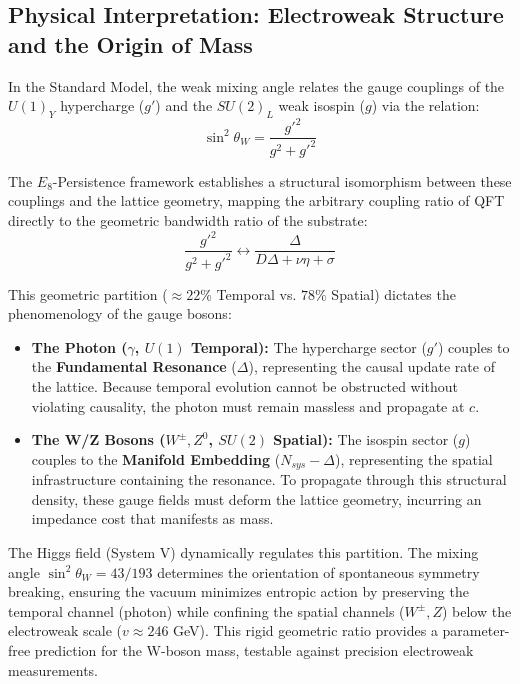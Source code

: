 \subsection{Physical Interpretation: Electroweak Structure and the Origin of Mass}

In the Standard Model, the weak mixing angle relates the gauge couplings of the $U(1)_Y$ hypercharge ($g'$) and the $SU(2)_L$ weak isospin ($g$) via the relation:
\begin{equation}
\sin^2\theta_W = \frac{g'^2}{g^2 + g'^2}
\end{equation}

The $E_8$-Persistence framework establishes a structural isomorphism between these couplings and the lattice geometry, mapping the arbitrary coupling ratio of QFT directly to the geometric bandwidth ratio of the substrate:
\begin{equation}
\frac{g'^2}{g^2 + g'^2} \longleftrightarrow \frac{\Delta}{D\Delta + \nu\eta + \sigma}
\end{equation}

This geometric partition ($\approx 22\%$ Temporal vs. $78\%$ Spatial) dictates the phenomenology of the gauge bosons:

\begin{itemize}
    \item \textbf{The Photon ($\gamma$, $U(1)$ Temporal):} The hypercharge sector ($g'$) couples to the \textbf{Fundamental Resonance} ($\Delta$), representing the causal update rate of the lattice. Because temporal evolution cannot be obstructed without violating causality, the photon must remain massless and propagate at $c$.
    
    \item \textbf{The W/Z Bosons ($W^{\pm}, Z^0$, $SU(2)$ Spatial):} The isospin sector ($g$) couples to the \textbf{Manifold Embedding} ($N_{sys} - \Delta$), representing the spatial infrastructure containing the resonance. To propagate through this structural density, these gauge fields must deform the lattice geometry, incurring an impedance cost that manifests as mass.
\end{itemize}

The Higgs field (System V) dynamically regulates this partition. The mixing angle $\sin^2\theta_W = 43/193$ determines the orientation of spontaneous symmetry breaking, ensuring the vacuum minimizes entropic action by preserving the temporal channel (photon) while confining the spatial channels ($W^{\pm}, Z$) below the electroweak scale ($v \approx 246$ GeV). This rigid geometric ratio provides a parameter-free prediction for the W-boson mass, testable against precision electroweak measurements.

